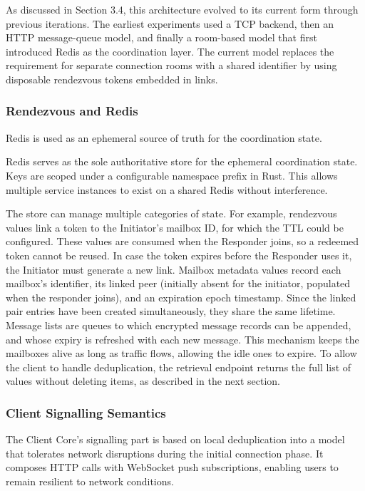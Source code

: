 \documentclass[12pt,a4paper]{article}
\begin{document}
As discussed in Section 3.4, this architecture evolved to its current form through previous iterations. The earliest experiments used a TCP backend, then an HTTP message-queue model, and finally a room-based model that first introduced Redis as the coordination layer. The current model replaces the requirement for separate connection rooms with a shared identifier by using disposable rendezvous tokens embedded in links.

\subsubsection{Rendezvous and Redis}

Redis is used as an ephemeral source of truth for the coordination state.

Redis serves as the sole authoritative store for the ephemeral coordination state. Keys are scoped under a configurable namespace prefix in Rust. This allows multiple service instances to exist on a shared Redis without interference.

The store can manage multiple categories of state. For example, rendezvous values link a token to the Initiator’s mailbox ID, for which the TTL could be configured. These values are consumed when the Responder joins, so a redeemed token cannot be reused. In case the token expires before the Responder uses it, the Initiator must generate a new link. Mailbox metadata values record each mailbox’s identifier, its linked peer (initially absent for the initiator, populated when the responder joins), and an expiration epoch timestamp. Since the linked pair entries have been created simultaneously, they share the same lifetime. Message lists are queues to which encrypted message records can be appended, and whose expiry is refreshed with each new message. This mechanism keeps the mailboxes alive as long as traffic flows, allowing the idle ones to expire. To allow the client to handle deduplication, the retrieval endpoint returns the full list of values without deleting items, as described in the next section.

\subsubsection{Client Signalling Semantics}

The Client Core’s signalling part is based on local deduplication into a model that tolerates network disruptions during the initial connection phase. It composes HTTP calls with WebSocket push subscriptions, enabling users to remain resilient to network conditions.
\end{document}
